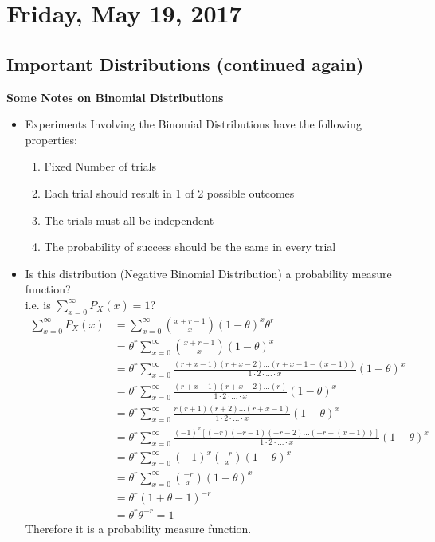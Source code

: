\documentclass[12pt, twoside]{article}
\begin{document}
\section{Friday, May 19, 2017}

\subsection{Important Distributions (continued again)}
\textbf{Some Notes on Binomial Distributions}
\begin{itemize}
	\item{
	Experiments Involving the Binomial Distributions have the following properties:
	\begin{enumerate}
		\item{Fixed Number of trials}
		\item{Each trial should result in 1 of 2 possible outcomes}
		\item{The trials must all be independent}
		\item{The probability of success should be the same in every trial}
	\end{enumerate}
	}
	\item{
	Is this distribution (Negative Binomial Distribution) a probability measure function?\\
	i.e. is $\sum^\infty_{x=0} P_X (x) = 1$?
	\begin{align*}
		\sum^\infty_{x=0} P_X (x) &= \sum^\infty_{x=0} \binom{x+r - 1}{x} (1 - \theta)^x \theta^{r}\\
		&= \theta^{r} \sum^\infty_{x=0} \binom{x+r - 1}{x} (1 - \theta)^x\\
		&= \theta^{r} \sum^\infty_{x=0} \frac{(r+x-1)(r+x-2)...(r+x-1-(x-1))}{1 \cdot 2 \cdot ... \cdot x} (1 - \theta)^x\\
		&= \theta^{r} \sum^\infty_{x=0} \frac{(r+x-1)(r+x-2)...(r)}{1 \cdot 2 \cdot ... \cdot x} (1 - \theta)^x\\
		&= \theta^{r} \sum^\infty_{x=0} \frac{r(r+1)(r+2)...(r+x-1)}{1 \cdot 2 \cdot ... \cdot x} (1 - \theta)^x\\
		&= \theta^{r} \sum^\infty_{x=0} \frac{(-1)^x[(-r)(-r-1)(-r-2)...(-r-(x-1))]}{1 \cdot 2 \cdot ... \cdot x} (1 - \theta)^x\\
		&= \theta^{r} \sum^\infty_{x=0} (-1)^x \binom{-r}{x} (1 - \theta)^x\\
		&= \theta^{r} \sum^\infty_{x=0} \binom{-r}{x} (1 - \theta)^x\\
		&= \theta^{r} (1 + \theta - 1)^{-r}\\
		&= \theta^{r} \theta^{-r} = 1
	\end{align*}
	Therefore it is a probability measure function.

	}
\end{itemize}
\end{document}
